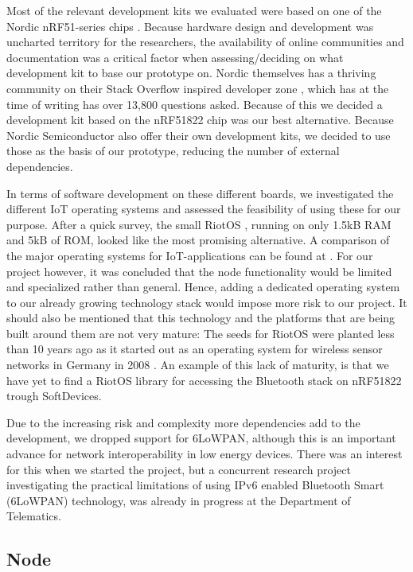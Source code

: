 Most of the relevant development kits we evaluated were based on one of the Nordic nRF51-series chips \cite{newRef:36, newRef:36:2}. Because hardware design and development was uncharted territory for the researchers, the availability of online communities and documentation was a critical factor when assessing/deciding on what development kit to base our prototype on. Nordic themselves has a thriving community on their Stack Overflow inspired developer zone \cite{newRef:50}, which has at the time of writing has over 13,800 questions asked. Because of this we decided a development kit based on the  nRF51822 chip was our best alternative. Because Nordic Semiconductor also offer their own development kits, we decided to use those as the basis of our prototype, reducing the number of external dependencies. 

In terms of software development on these different boards, we investigated the different IoT operating systems and assessed the feasibility of using these for our purpose. After a quick survey, the small RiotOS \cite{Anonymous:a1din1ZK}, running on only 1.5kB RAM and 5kB of ROM, looked like the most promising alternative. A comparison of the major operating systems for IoT-applications can be found at \cite{Anonymous:a1din1ZK}. For our project however, it was concluded that the node functionality would be limited and specialized rather than general. Hence, adding a dedicated operating system to our already growing technology stack would impose more risk to our project. It should also be mentioned that this technology and the platforms that are being built around them are not very mature: The seeds for RiotOS were planted less than 10 years ago as it started out as an operating system for wireless sensor networks in Germany in 2008 \cite{newRef:52}. An example of this lack of maturity, is that we have yet to find a RiotOS library for accessing the Bluetooth stack on nRF51822 trough SoftDevices.

Due to the increasing risk and complexity more dependencies add to the development, we dropped support for 6LoWPAN, although this is an important advance for network interoperability in low energy devices. There was an interest for this when we started the project, but a concurrent research project investigating the practical limitations of using IPv6 enabled Bluetooth Smart (6LoWPAN) technology, was already in progress at the Department of Telematics.


\subsection{Node} %
\label{sub:node}

